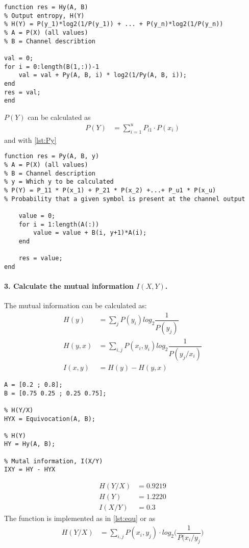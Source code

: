 \documentclass[Main]{subfiles}
\begin{document}
\begin{lstlisting}[caption=Output entropy -- H(Y), style=Code-Matlab, label=lst:Hy]
function res = Hy(A, B)
% Output entropy, H(Y)
% H(Y) = P(y_1)*log2(1/P(y_1)) + ... + P(y_n)*log2(1/P(y_n))
% A = P(X) (all values)
% B = Channel describtion

val = 0;
for i = 0:length(B(1,:))-1
    val = val + Py(A, B, i) * log2(1/Py(A, B, i));
end
res = val;
end
\end{lstlisting}
$P(Y)$ can be calculated as 
\begin{align}
P(Y) &= \sum_{i=1}^u P_{i1} \cdot P(x_i)
\end{align}
and with \codeTitle \ref{lst:Py}

\begin{lstlisting}[caption=P(Y), style=Code-Matlab, label=lst:Py]
function res = Py(A, B, y)
% A = P(X) (all values)
% B = Channel description
% y = Which y to be calculated
% P(Y) = P_11 * P(x_1) + P_21 * P(x_2) +...+ P_u1 * P(x_u)
% Probability that a given symbol is present at the channel output

    value = 0;
    for i = 1:length(A(:))
        value = value + B(i, y+1)*A(i);
    end
    
    res = value;
end
\end{lstlisting}










\paragraph{3. Calculate the mutual information $I(X,Y)$.}
The mutual information can be calculated as:
\begin{align}
H(y) &= \sum_j P(y_i)log_2 \dfrac{1}{P(y_j)}\\
H(y,x) &= \sum_{i,j} P(x_i, y_i)log_2\dfrac{1}{P(y_j/x_i)}\\
I(x,y) &= H(y) - H(y,x)	
\end{align}




\begin{lstlisting}[caption=Mutual information, style=Code-Matlab, label=lst:Mutual]
A = [0.2 ; 0.8];
B = [0.75 0.25 ; 0.25 0.75];

% H(Y/X)
HYX = Equivocation(A, B);

% H(Y)
HY = Hy(A, B);

% Mutal information, I(X/Y)
IXY = HY - HYX

\end{lstlisting}
\begin{align}
H(Y/X) &= 0.9219\\
H(Y) &= 1.2220\\
I(X/Y) &= 0.3
\end{align}
The function  is implemented as in \codeTitle \ref{lst:equ} or as
\begin{align}
H(Y/X) &= \sum_{i,j} P(x_i, y_j) \cdot log_2\bigg(\dfrac{1}{P(x_i/y_j}\bigg)
\end{align}
\end{document}
